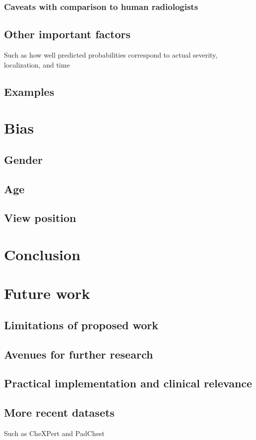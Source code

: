\documentclass[11pt,twoside,a4paper]{report}
\begin{document}
        \subsection{Caveats with comparison to human radiologists}
    \section{Other important factors}
    Such as how well predicted probabilities correspond to actual severity, localization, and time
    \section{Examples}
\chapter{Bias\label{bias}}
    \section{Gender}
    \section{Age}
    \section{View position}
\chapter{Conclusion}
\chapter{Future work}
    \section{Limitations of proposed work}
    \section{Avenues for further research}
    \section{Practical implementation and clinical relevance\label{practical}}
    \section{More recent datasets}
    Such as CheXPert and PadChest
\end{document}
